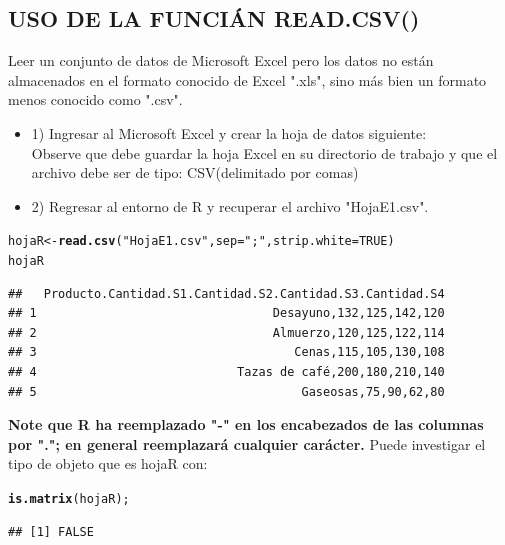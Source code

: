 \documentclass[12pt,letterpaper]{article}\usepackage[]{graphicx}\usepackage[]{color}
\makeatletter
\newcommand{\hlnum}[1]{\textcolor[rgb]{0.686,0.059,0.569}{#1}}%
\newcommand{\hlstr}[1]{\textcolor[rgb]{0.192,0.494,0.8}{#1}}%
\newcommand{\hlstd}[1]{\textcolor[rgb]{0.345,0.345,0.345}{#1}}%
\newcommand{\hlkwb}[1]{\textcolor[rgb]{0.69,0.353,0.396}{#1}}%
\newcommand{\hlkwc}[1]{\textcolor[rgb]{0.333,0.667,0.333}{#1}}%
\newcommand{\hlkwd}[1]{\textcolor[rgb]{0.737,0.353,0.396}{\textbf{#1}}}%
\newenvironment{kframe}{%
 \def\at@end@of@kframe{}%
 \ifinner\ifhmode%
  \def\at@end@of@kframe{\end{minipage}}%
  \begin{minipage}{\columnwidth}%
 \fi\fi%
 \def\FrameCommand##1{\hskip\@totalleftmargin \hskip-\fboxsep
 \colorbox{shadecolor}{##1}\hskip-\fboxsep
     \hskip-\linewidth \hskip-\@totalleftmargin \hskip\columnwidth}%
 \MakeFramed {\advance\hsize-\width
   \@totalleftmargin\z@ \linewidth\hsize
   \@setminipage}}%
 {\par\unskip\endMakeFramed%
 \at@end@of@kframe}
\newenvironment{knitrout}{}{} %
\makeatother
\begin{document}
\begin{itemize}
\section{USO DE LA FUNCI\'AN READ.CSV()}
Leer un conjunto de datos de Microsoft Excel pero los datos no est\'an almacenados en el formato
conocido de Excel ".xls", sino m\'as bien un formato menos conocido como ".csv".
\begin {itemize}
\item {1) } Ingresar al Microsoft Excel y crear la hoja de datos siguiente:\\
Observe que debe guardar la hoja Excel en su directorio de trabajo y que el archivo debe ser de
tipo: CSV(delimitado por comas)
\item 2) Regresar al entorno de R y recuperar el archivo "HojaE1.csv".
\end{itemize}
\begin{knitrout}
\color{fgcolor}\begin{kframe}
\begin{alltt}
\hlstd{hojaR} \hlkwb{<-} \hlkwd{read.csv}\hlstd{(}\hlstr{"HojaE1.csv"}\hlstd{,} \hlkwc{sep} \hlstd{=} \hlstr{";"}\hlstd{,} \hlkwc{strip.white} \hlstd{=} \hlnum{TRUE}\hlstd{)}
\hlstd{hojaR}
\end{alltt}
\begin{verbatim}
##   Producto.Cantidad.S1.Cantidad.S2.Cantidad.S3.Cantidad.S4
## 1                                 Desayuno,132,125,142,120
## 2                                 Almuerzo,120,125,122,114
## 3                                    Cenas,115,105,130,108
## 4                            Tazas de café,200,180,210,140
## 5                                     Gaseosas,75,90,62,80
\end{verbatim}
\end{kframe}
\end{knitrout}
\textbf{Note que R ha reemplazado "-" en los encabezados de las columnas por "."; en general
reemplazar\'a cualquier car\'acter.}
\newpage
Puede investigar el tipo de objeto que es hojaR con:
\begin{knitrout}
\color{fgcolor}\begin{kframe}
\begin{alltt}
\hlkwd{is.matrix}\hlstd{(hojaR);}
\end{alltt}
\begin{verbatim}
## [1] FALSE
\end{verbatim}
\begin{alltt}

\end{alltt}
\end{kframe}
\end{knitrout}
\end{itemize}
\end{document}
